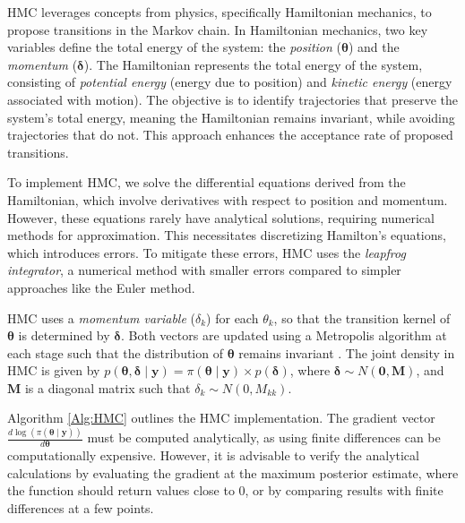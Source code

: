 HMC leverages concepts from physics, specifically Hamiltonian mechanics, to propose transitions in the Markov chain. In Hamiltonian mechanics, two key variables define the total energy of the system: the \textit{position} (\(\bm{\theta}\)) and the \textit{momentum} (\(\bm{\delta}\)). The Hamiltonian represents the total energy of the system, consisting of \textit{potential energy} (energy due to position) and \textit{kinetic energy} (energy associated with motion). The objective is to identify trajectories that preserve the system's total energy, meaning the Hamiltonian remains invariant, while avoiding trajectories that do not. This approach enhances the acceptance rate of proposed transitions.

To implement HMC, we solve the differential equations derived from the Hamiltonian, which involve derivatives with respect to position and momentum. However, these equations rarely have analytical solutions, requiring numerical methods for approximation. This necessitates discretizing Hamilton’s equations, which introduces errors. To mitigate these errors, HMC uses the \textit{leapfrog integrator}, a numerical method with smaller errors compared to simpler approaches like the Euler method.

HMC uses a \textit{momentum variable} (\(\delta_k\)) for each \(\theta_k\), so that the transition kernel of \(\bm{\theta}\) is determined by \(\bm{\delta}\). Both vectors are updated using a Metropolis algorithm at each stage such that the distribution of \(\bm{\theta}\) remains invariant \cite{neal2011mcmc}. The joint density in HMC is given by \( p(\bm{\theta}, \bm{\delta} \mid  \bm{y}) = \pi(\bm{\theta} \mid  \bm{y}) \times p(\bm{\delta}) \), where \(\bm{\delta} \sim N(\bm{0}, \bm{M})\), and \(\bm{M}\) is a diagonal matrix such that \(\delta_k \sim N(0, M_{kk})\). 

Algorithm \ref{Alg:HMC} outlines the HMC implementation. The gradient vector \(\frac{d\log(\pi(\bm{\theta}\mid \bm{y}))}{d\bm{\theta}}\) must be computed analytically, as using finite differences can be computationally expensive. However, it is advisable to verify the analytical calculations by evaluating the gradient at the maximum posterior estimate, where the function should return values close to 0, or by comparing results with finite differences at a few points. 


